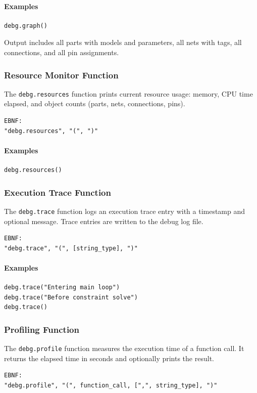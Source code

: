 \paragraph{Examples}
\begin{verbatim}
debg.graph()
\end{verbatim}

Output includes all parts with models and parameters, all nets with tags, all connections, and all pin assignments.

\subsubsection{Resource Monitor Function}
The \texttt{debg.resources} function prints current resource usage: memory, CPU time elapsed, and object counts (parts, nets, connections, pins).
\begin{verbatim}
EBNF:
"debg.resources", "(", ")"
\end{verbatim}

\paragraph{Examples}
\begin{verbatim}
debg.resources()
\end{verbatim}

\subsubsection{Execution Trace Function}
The \texttt{debg.trace} function logs an execution trace entry with a timestamp and optional message. Trace entries are written to the debug log file.
\begin{verbatim}
EBNF:
"debg.trace", "(", [string_type], ")"
\end{verbatim}

\paragraph{Examples}
\begin{verbatim}
debg.trace("Entering main loop")
debg.trace("Before constraint solve")
debg.trace()
\end{verbatim}

\subsubsection{Profiling Function}
The \texttt{debg.profile} function measures the execution time of a function call. It returns the elapsed time in seconds and optionally prints the result.
\begin{verbatim}
EBNF:
"debg.profile", "(", function_call, [",", string_type], ")"
\end{verbatim}

